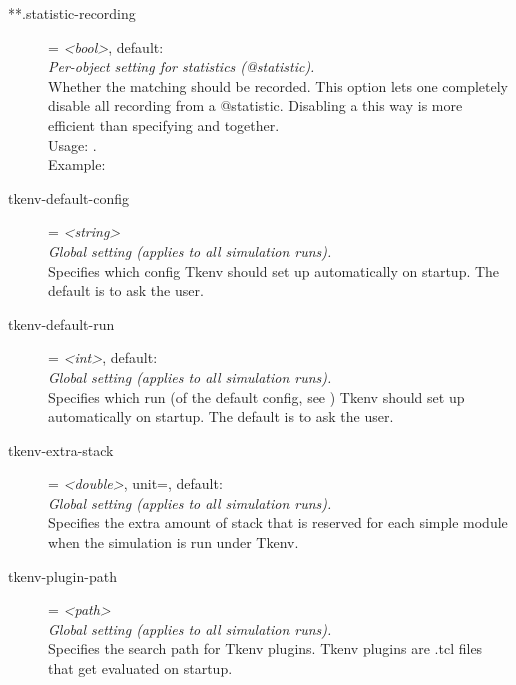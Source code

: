 \begin{description}
\item[**.statistic-recording] = \textit{<bool>}, default: \\
    \textit{Per-object setting for statistics (@statistic).}\\
    Whether the matching  should be recorded. This
    option lets one completely disable all recording from a @statistic.
    Disabling a  this way is more efficient than
    specifying
     and
    together.\\Usage:
    .\\Example:
\item[tkenv-default-config] = \textit{<string>}\\
    \textit{Global setting (applies to all simulation runs).}\\
    Specifies which config Tkenv should set up automatically on startup. The
    default is to ask the user.
\item[tkenv-default-run] = \textit{<int>}, default: \\
    \textit{Global setting (applies to all simulation runs).}\\
    Specifies which run (of the default config, see
    ) Tkenv should set up
    automatically on startup. The default is to ask the user.
\item[tkenv-extra-stack] = \textit{<double>}, unit=, default: \\
    \textit{Global setting (applies to all simulation runs).}\\
    Specifies the extra amount of stack that is reserved for each
     simple module when the simulation is run under Tkenv.
\item[tkenv-plugin-path] = \textit{<path>}\\
    \textit{Global setting (applies to all simulation runs).}\\
    Specifies the search path for Tkenv plugins. Tkenv plugins are .tcl files
    that get evaluated on startup.

\end{description}
